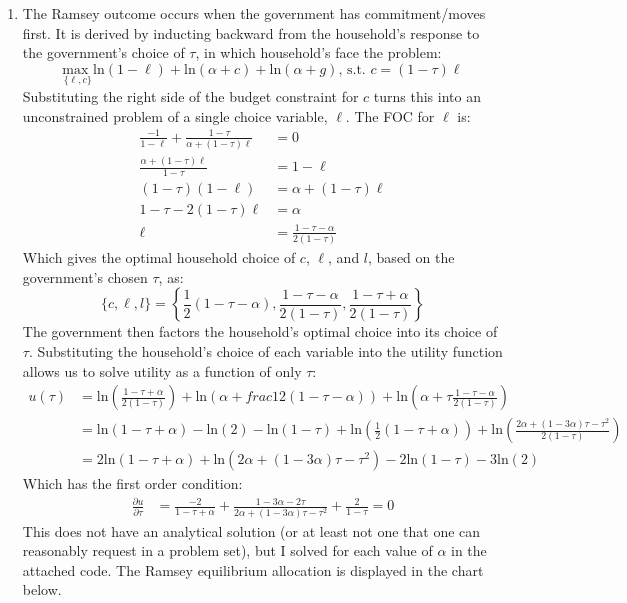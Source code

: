 \documentclass{article}
\newcommand{\loge}[1]{\text{ln}\left(#1\right)}
\newcommand{\usmax}[1]{\underset{\{#1\}}{\text{max }}}
\begin{document}
\begin{enumerate}
	\item The Ramsey outcome occurs when the government has commitment/moves first. It is derived by inducting backward from the household's response to the government's choice of $\tau$, in which household's face the problem:
		\[
			\usmax{\ell,c}\loge{1-\ell} + \loge{\alpha + c} + \loge{\alpha + g}\text{, s.t. }c=(1-\tau)\ell
		\]
		Substituting the right side of the budget constraint for $c$ turns this into an unconstrained problem of a single choice variable, $\ell$. The FOC for $\ell$ is:
		\begin{align*}
			\frac{-1}{1-\ell} + \frac{1-\tau}{\alpha + (1-\tau)\ell}  &= 0	\\
			\frac{\alpha + (1-\tau)\ell}{1-\tau}&= 1-\ell  \\
			(1-\tau)(1-\ell) &= \alpha + (1-\tau)\ell \\
			1-\tau-2(1-\tau)\ell &= \alpha \\
			\ell &= \frac{1-\tau-\alpha}{2(1-\tau)}
		\end{align*}
		Which gives the optimal household choice of $c$, $\ell$, and $l$, based on the government's chosen $\tau$, as:
		\[
			\{c,\ell,l\} = \left\{\frac{1}{2}\left(1-\tau-\alpha\right),\frac{1-\tau-\alpha}{2(1-\tau)},\frac{1-\tau+\alpha}{2(1-\tau)} \right\}
		\]
		The government then factors the household's optimal choice into its choice of $\tau$. Substituting the household's choice of each variable into the utility function allows us to solve utility as a function of only $\tau$:
		\begin{align*}
			u(\tau) &= \loge{\frac{1-\tau+\alpha}{2(1-\tau)} } + \loge{\alpha + frac{1}{2}\left(1-\tau-\alpha\right)} + \loge{\alpha + \tau\frac{1-\tau-\alpha}{2(1-\tau)}} \\
					&= \loge{1-\tau+\alpha} - \loge{2} - \loge{1-\tau} + \loge{\frac{1}{2}(1-\tau+\alpha)} +
					   \loge{\frac{2\alpha + (1-3\alpha)\tau-\tau^2}{2(1-\tau)}} \\
					&= 2\loge{1-\tau+\alpha} + \loge{2\alpha + (1-3\alpha)\tau-\tau^2} - 2\loge{1-\tau} - 3\loge{2}
		\end{align*}
		Which has the first order condition:
		\begin{align*}
			\frac{\partial u}{\partial\tau} &= \frac{-2}{1-\tau+\alpha} + \frac{1-3\alpha - 2\tau}{2\alpha + (1-3\alpha)\tau-\tau^2} + \frac{2}{1-\tau} = 0
		\end{align*}
		This does not have an analytical solution (or at least not one that one can reasonably request in a problem set), but I solved for each value of $\alpha$ in the attached code. The Ramsey equilibrium allocation is displayed in the chart below.

\end{enumerate}
\end{document}
